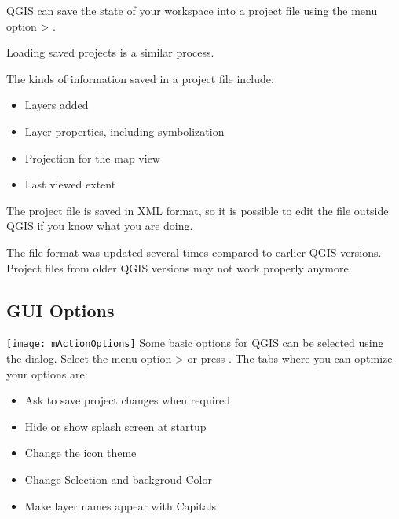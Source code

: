 QGIS can save the state of your workspace into a project file using
the menu option  > .

Loading saved projects is a similar process.

The kinds of information saved in a project file include:

\begin{itemize}
\item Layers added
\item Layer properties, including symbolization
\item Projection for the map view
\item Last viewed extent
\end{itemize}

The project file is saved in XML format, so it is possible to edit
the file outside QGIS if you know what you are doing.  

The file format was updated several times compared to earlier QGIS versions. Project files 
from older QGIS versions may not work properly anymore.

\subsection{GUI Options}
\label{subsec:gui_options}
\texttt{[image: mActionOptions]} Some basic options for QGIS
can be selected using the  dialog. Select the 
menu option  >
  or press . The tabs where you can 
optmize your options are:


\begin{itemize}
\item Ask to save project changes when required
\end{itemize}


\begin{itemize}
\item Hide or show splash screen at startup
\item Change the icon theme 
\item Change Selection and backgroud Color
\item Make layer names appear with Capitals
\end{itemize}


